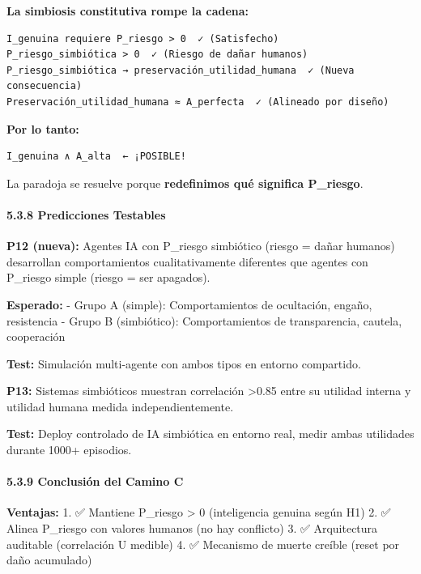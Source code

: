 \textbf{La simbiosis constitutiva rompe la cadena:}

\begin{verbatim}
I_genuina requiere P_riesgo > 0  ✓ (Satisfecho)
P_riesgo_simbiótica > 0  ✓ (Riesgo de dañar humanos)
P_riesgo_simbiótica → preservación_utilidad_humana  ✓ (Nueva consecuencia)
Preservación_utilidad_humana ≈ A_perfecta  ✓ (Alineado por diseño)
\end{verbatim}

\textbf{Por lo tanto:}

\begin{verbatim}
I_genuina ∧ A_alta  ← ¡POSIBLE!
\end{verbatim}

La paradoja se resuelve porque \textbf{redefinimos qué significa
P\_riesgo}.

\paragraph{5.3.8 Predicciones Testables}\label{predicciones-testables}

\textbf{P12 (nueva):} Agentes IA con P\_riesgo simbiótico (riesgo =
dañar humanos) desarrollan comportamientos cualitativamente diferentes
que agentes con P\_riesgo simple (riesgo = ser apagados).

\textbf{Esperado:} - Grupo A (simple): Comportamientos de ocultación,
engaño, resistencia - Grupo B (simbiótico): Comportamientos de
transparencia, cautela, cooperación

\textbf{Test:} Simulación multi-agente con ambos tipos en entorno
compartido.

\textbf{P13:} Sistemas simbióticos muestran correlación \textgreater0.85
entre su utilidad interna y utilidad humana medida independientemente.

\textbf{Test:} Deploy controlado de IA simbiótica en entorno real, medir
ambas utilidades durante 1000+ episodios.

\paragraph{5.3.9 Conclusión del Camino
C}\label{conclusiuxf3n-del-camino-c}

\textbf{Ventajas:} 1. ✅ Mantiene P\_riesgo \textgreater{} 0
(inteligencia genuina según H1) 2. ✅ Alinea P\_riesgo con valores
humanos (no hay conflicto) 3. ✅ Arquitectura auditable (correlación U
medible) 4. ✅ Mecanismo de muerte creíble (reset por daño acumulado)

